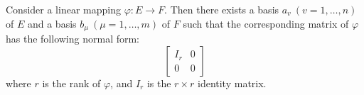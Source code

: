 Consider a linear mapping $\varphi: E \rightarrow F$. Then there exists a basis $a_v\ (v = 1, \dots, n)$ of $E$ and a basis $b_\mu\ (\mu = 1, \dots, m)$ of $F$ such that the corresponding matrix of $\varphi$ has the following normal form:
$$
\begin{bmatrix}
I_r & 0 \\
0 & 0
\end{bmatrix}
$$
where $r$ is the rank of $\varphi$, and $I_r$ is the $r \times r$ identity matrix.
